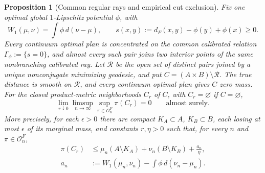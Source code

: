 \documentclass[11pt,reqno]{amsart}
\newtheorem{proposition}[theorem]{Proposition}
\theoremstyle{definition}
\theoremstyle{remark}
\numberwithin{equation}{section}
\begin{document}
\begin{proposition}[Common regular rays and empirical cut exclusion]
\label{prop:general-regular-pairs}
Fix one optimal global \(1\)-Lipschitz potential \(\phi\), with
\[
W_1(\mu,\nu)=\int\phi\,d(\nu-\mu),\qquad
s(x,y):=d_F(x,y)-\phi(y)+\phi(x)\ge0.
\]
Every continuum optimal plan is concentrated on the common calibrated
relation \(\Gamma_\phi:=\{s=0\}\), and almost every such pair joins
two interior points of the same nonbranching calibrated ray.
Let \(\mathcal R\) be the open set of distinct pairs joined by a
unique nonconjugate minimizing geodesic, and put
\(C=(A\times B)\setminus\mathcal R\). The true distance is smooth
on \(\mathcal R\), and every continuum optimal plan gives \(C\)
zero mass. For the closed product-metric neighborhoods \(C_r\)
of \(C\), with \(C_r=\varnothing\) if \(C=\varnothing\),
\[
\lim_{r\downarrow0}\limsup_{n\to\infty}
\sup_{\pi\in\mathcal O_n^F}\pi(C_r)=0
\qquad\text{almost surely}.
\]
More precisely, for each \(\epsilon>0\) there are compact
\(K_A\subset A\), \(K_B\subset B\), each losing at most
\(\epsilon\) of its marginal mass, and constants \(r,\eta>0\)
such that, for every \(n\) and \(\pi\in\mathcal O_n^F\),
\begin{equation}
\label{eq:general-cut-slack}
\begin{aligned}
\pi(C_r)&\le
\mu_n(A\setminus K_A)+\nu_n(B\setminus K_B)
+\frac{a_n}{\eta},\\
a_n&:=W_1(\mu_n,\nu_n)-\int\phi\,d(\nu_n-\mu_n).
\end{aligned}
\end{equation}
\end{proposition}
\end{document}
